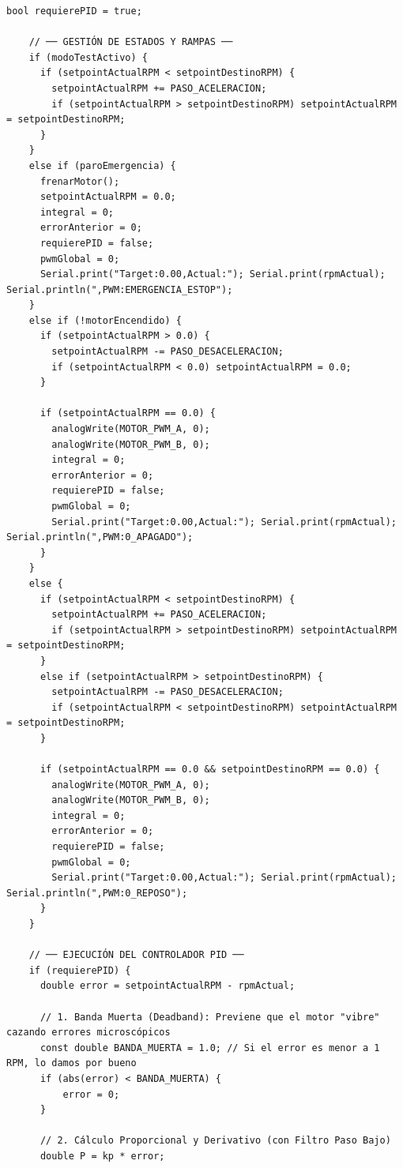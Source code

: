 \documentclass[11pt, letterpaper]{article}
\begin{document}
\begin{lstlisting}[caption={main.cpp --- PID + MQTT + publicaci\'on a InfluxDB}]
    bool requierePID = true;

    // ── GESTIÓN DE ESTADOS Y RAMPAS ──
    if (modoTestActivo) {
      if (setpointActualRPM < setpointDestinoRPM) {
        setpointActualRPM += PASO_ACELERACION;
        if (setpointActualRPM > setpointDestinoRPM) setpointActualRPM = setpointDestinoRPM;
      }
    }
    else if (paroEmergencia) {
      frenarMotor();
      setpointActualRPM = 0.0; 
      integral = 0;
      errorAnterior = 0;
      requierePID = false;
      pwmGlobal = 0;
      Serial.print("Target:0.00,Actual:"); Serial.print(rpmActual); Serial.println(",PWM:EMERGENCIA_ESTOP");
    } 
    else if (!motorEncendido) {
      if (setpointActualRPM > 0.0) {
        setpointActualRPM -= PASO_DESACELERACION;
        if (setpointActualRPM < 0.0) setpointActualRPM = 0.0;
      }
      
      if (setpointActualRPM == 0.0) {
        analogWrite(MOTOR_PWM_A, 0);
        analogWrite(MOTOR_PWM_B, 0);
        integral = 0;
        errorAnterior = 0;
        requierePID = false;
        pwmGlobal = 0;
        Serial.print("Target:0.00,Actual:"); Serial.print(rpmActual); Serial.println(",PWM:0_APAGADO");
      }
    } 
    else {
      if (setpointActualRPM < setpointDestinoRPM) {
        setpointActualRPM += PASO_ACELERACION;
        if (setpointActualRPM > setpointDestinoRPM) setpointActualRPM = setpointDestinoRPM;
      } 
      else if (setpointActualRPM > setpointDestinoRPM) {
        setpointActualRPM -= PASO_DESACELERACION;
        if (setpointActualRPM < setpointDestinoRPM) setpointActualRPM = setpointDestinoRPM;
      }
      
      if (setpointActualRPM == 0.0 && setpointDestinoRPM == 0.0) {
        analogWrite(MOTOR_PWM_A, 0);
        analogWrite(MOTOR_PWM_B, 0);
        integral = 0;
        errorAnterior = 0;
        requierePID = false;
        pwmGlobal = 0;
        Serial.print("Target:0.00,Actual:"); Serial.print(rpmActual); Serial.println(",PWM:0_REPOSO");
      }
    }

    // ── EJECUCIÓN DEL CONTROLADOR PID ──
    if (requierePID) {
      double error = setpointActualRPM - rpmActual;
      
      // 1. Banda Muerta (Deadband): Previene que el motor "vibre" cazando errores microscópicos
      const double BANDA_MUERTA = 1.0; // Si el error es menor a 1 RPM, lo damos por bueno
      if (abs(error) < BANDA_MUERTA) {
          error = 0; 
      }

      // 2. Cálculo Proporcional y Derivativo (con Filtro Paso Bajo)
      double P = kp * error;
      

\end{lstlisting}
\end{document}
